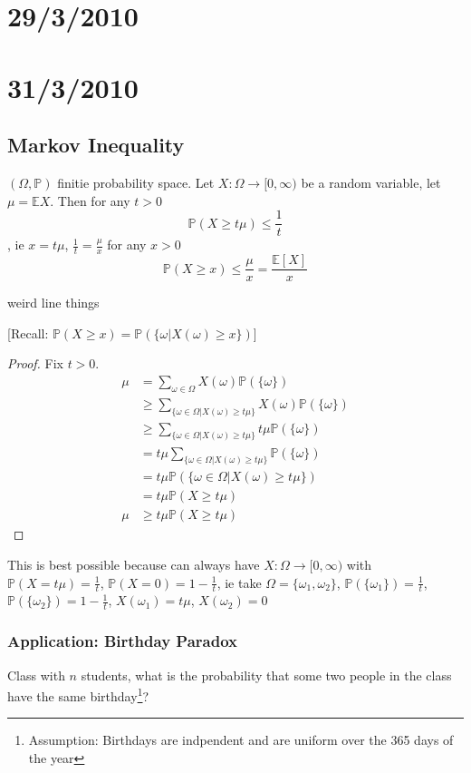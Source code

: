 \documentclass{article}
\begin{document}
\section*{29/3/2010}

\section*{31/3/2010}

\subsection*{Markov Inequality}

$(\Omega, \mathbb{P})$ finitie probability space.  Let $X : \Omega \rightarrow [0, \infty)$ be a random variable, let $\mu = \mathbb{E}X$.  Then for any $t>0$ \[\mathbb{P}(X\ge t \mu) \le \frac{1}{t}\], ie $x = t \mu$, $\frac{1}{t} = \frac{\mu}{x}$ for any $x >0$ \[\mathbb{P}(X\ge x) \le \frac{\mu}{x} = \frac{\mathbb{E}[X]}{x}\]

weird line things

[Recall: $\mathbb{P}(X \ge x) = \mathbb{P}(\{\omega | X(\omega) \ge x\})$]

\begin{proof}
Fix $t>0$. 
\begin{align*}
\mu &= \sum_{\omega \in \Omega} X(\omega) \mathbb{P}(\{\omega\}) \\
&\ge \sum_{\{\omega \in \Omega | X(\omega) \ge t \mu \}} X(\omega) \mathbb{P}(\{\omega\}) \\
& \ge \sum_{\{\omega \in \Omega | X(\omega) \ge t \mu \}} t \mu \mathbb{P}(\{\omega\}) \\
&= t \mu \sum_{\{\omega \in \Omega | X(\omega) \ge t \mu \}}  \mathbb{P}(\{\omega\}) \\
&= t \mu \mathbb{P}(\{\omega \in \Omega | X(\omega) \ge t \mu \}) \\
&= t \mu \mathbb{P}(X \ge t \mu) \\
\mu &\ge t \mu \mathbb{P}(X \ge t \mu)
\end{align*}
\end{proof}
This is best possible because can always have $X: \Omega \rightarrow [0, \infty)$ with $\mathbb{P}(X = t \mu) = \frac{1}{t}$, $\mathbb{P}(X=0) = 1 - \frac{1}{t}$, ie take $\Omega = \{\omega_1, \omega_2\}$, $\mathbb{P}(\{\omega_1\})= \frac{1}{t}$, $\mathbb{P}(\{\omega_2\})=1-\frac{1}{t}$, $X(\omega_1) = t \mu$, $X(\omega_2) = 0$

\subsubsection*{Application: Birthday Paradox}
Class with $n$ students, what is the probability that some two people in the class have the same birthday\footnote{Assumption: Birthdays are indpendent and are uniform over the 365 days of the year}?
\end{document}
